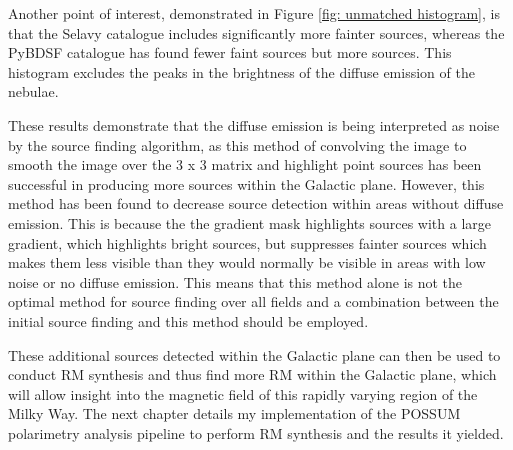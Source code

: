 Another point of interest, demonstrated in Figure \ref{fig: unmatched histogram}, is that the Selavy catalogue includes significantly more fainter sources, whereas the PyBDSF catalogue has found fewer faint sources but more sources. This histogram excludes the peaks in the brightness of the diffuse emission of the nebulae.

These results demonstrate that the diffuse emission is being interpreted as noise by the source finding algorithm, as this method of convolving the image to smooth the image over the 3 x 3 matrix and highlight point sources has been successful in producing more sources within the Galactic plane. However, this method has been found to decrease source detection within areas without diffuse emission. This is because the the gradient mask highlights sources with a large gradient, which highlights bright sources, but suppresses fainter sources which makes them less visible than they would normally be visible in areas with low noise or no diffuse emission. This means that this method alone is not the optimal method for source finding over all fields and a combination between the initial source finding and this method should be employed.

These additional sources detected within the Galactic plane can then be used to conduct RM synthesis and thus find more RM within the Galactic plane, which will allow insight into the magnetic field of this rapidly varying region of the Milky Way. The next chapter details my implementation of the POSSUM polarimetry analysis pipeline to perform RM synthesis and the results it yielded.